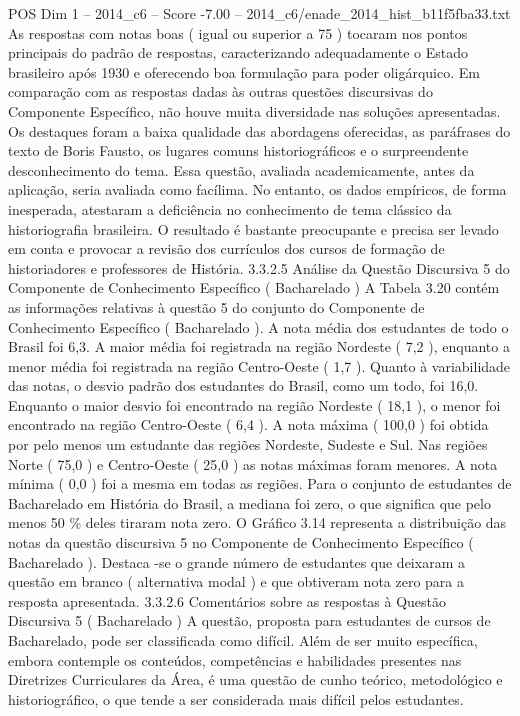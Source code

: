 \begin{textsample}{POS Dim 1 – 2014\_c6 – Score -7.00 – 2014\_c6/enade\_2014\_hist\_b11f5fba33.txt}
As respostas com notas boas ( igual ou superior a 75 ) tocaram nos pontos principais do padrão de respostas, caracterizando adequadamente o Estado brasileiro após 1930 e oferecendo boa formulação para poder oligárquico.
Em comparação com as respostas dadas às outras questões discursivas do Componente Específico, não houve muita diversidade nas soluções apresentadas.
Os destaques foram a baixa qualidade das abordagens oferecidas, as paráfrases do texto de Boris Fausto, os lugares comuns historiográficos e o surpreendente desconhecimento do tema.
Essa questão, avaliada academicamente, antes da aplicação, seria avaliada como facílima.
No entanto, os dados empíricos, de forma inesperada, atestaram a deficiência no conhecimento de tema clássico da historiografia brasileira.
O resultado é bastante preocupante e precisa ser levado em conta e provocar a revisão dos currículos dos cursos de formação de historiadores e professores de História. 3.3.2.5 Análise da Questão Discursiva 5 do Componente de Conhecimento Específico ( Bacharelado ) A Tabela 3.20 contém as informações relativas à questão 5 do conjunto do Componente de Conhecimento Específico ( Bacharelado ).
A nota média dos estudantes de todo o Brasil foi 6,3.
A maior média foi registrada na região Nordeste ( 7,2 ), enquanto a menor média foi registrada na região Centro-Oeste ( 1,7 ).
Quanto à variabilidade das notas, o desvio padrão dos estudantes do Brasil, como um todo, foi 16,0.
Enquanto o maior desvio foi encontrado na região Nordeste ( 18,1 ), o menor foi encontrado na região Centro-Oeste ( 6,4 ).
A nota máxima ( 100,0 ) foi obtida por pelo menos um estudante das regiões Nordeste, Sudeste e Sul.
Nas regiões Norte ( 75,0 ) e Centro-Oeste ( 25,0 ) as notas máximas foram menores.
A nota mínima ( 0,0 ) foi a mesma em todas as regiões.
Para o conjunto de estudantes de Bacharelado em História do Brasil, a mediana foi zero, o que significa que pelo menos 50 \% deles tiraram nota zero.
O Gráfico 3.14 representa a distribuição das notas da questão discursiva 5 no Componente de Conhecimento Específico ( Bacharelado ).
Destaca -se o grande número de estudantes que deixaram a questão em branco ( alternativa modal ) e que obtiveram nota zero para a resposta apresentada. 3.3.2.6 Comentários sobre as respostas à Questão Discursiva 5 ( Bacharelado ) A questão, proposta para estudantes de cursos de Bacharelado, pode ser classificada como difícil.
Além de ser muito específica, embora contemple os conteúdos, competências e habilidades presentes nas Diretrizes Curriculares da Área, é uma questão de cunho teórico, metodológico e historiográfico, o que tende a ser considerada mais difícil pelos estudantes.

\end{textsample}

